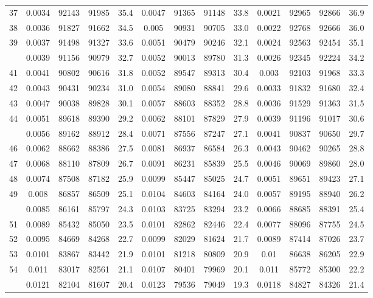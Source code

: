 \documentclass[
  14pt,
]{article}
\begin{document}
\begin{longtable}[t]{lcccccccccccc}
37 & 0.0034 & 92143 & 91985 & 35.4 & 0.0047 & 91365 & 91148 & 33.8 & 0.0021 & 92965 & 92866 & 36.9\\
38 & 0.0036 & 91827 & 91662 & 34.5 & 0.005 & 90931 & 90705 & 33.0 & 0.0022 & 92768 & 92666 & 36.0\\
39 & 0.0037 & 91498 & 91327 & 33.6 & 0.0051 & 90479 & 90246 & 32.1 & 0.0024 & 92563 & 92454 & 35.1\\
\addlinespace
40 & 0.0039 & 91156 & 90979 & 32.7 & 0.0052 & 90013 & 89780 & 31.3 & 0.0026 & 92345 & 92224 & 34.2\\
41 & 0.0041 & 90802 & 90616 & 31.8 & 0.0052 & 89547 & 89313 & 30.4 & 0.003 & 92103 & 91968 & 33.3\\
42 & 0.0043 & 90431 & 90234 & 31.0 & 0.0054 & 89080 & 88841 & 29.6 & 0.0033 & 91832 & 91680 & 32.4\\
43 & 0.0047 & 90038 & 89828 & 30.1 & 0.0057 & 88603 & 88352 & 28.8 & 0.0036 & 91529 & 91363 & 31.5\\
44 & 0.0051 & 89618 & 89390 & 29.2 & 0.0062 & 88101 & 87829 & 27.9 & 0.0039 & 91196 & 91017 & 30.6\\
\addlinespace
45 & 0.0056 & 89162 & 88912 & 28.4 & 0.0071 & 87556 & 87247 & 27.1 & 0.0041 & 90837 & 90650 & 29.7\\
46 & 0.0062 & 88662 & 88386 & 27.5 & 0.0081 & 86937 & 86584 & 26.3 & 0.0043 & 90462 & 90265 & 28.8\\
47 & 0.0068 & 88110 & 87809 & 26.7 & 0.0091 & 86231 & 85839 & 25.5 & 0.0046 & 90069 & 89860 & 28.0\\
48 & 0.0074 & 87508 & 87182 & 25.9 & 0.0099 & 85447 & 85025 & 24.7 & 0.0051 & 89651 & 89423 & 27.1\\
49 & 0.008 & 86857 & 86509 & 25.1 & 0.0104 & 84603 & 84164 & 24.0 & 0.0057 & 89195 & 88940 & 26.2\\
\addlinespace
50 & 0.0085 & 86161 & 85797 & 24.3 & 0.0103 & 83725 & 83294 & 23.2 & 0.0066 & 88685 & 88391 & 25.4\\
51 & 0.0089 & 85432 & 85050 & 23.5 & 0.0101 & 82862 & 82446 & 22.4 & 0.0077 & 88096 & 87755 & 24.5\\
52 & 0.0095 & 84669 & 84268 & 22.7 & 0.0099 & 82029 & 81624 & 21.7 & 0.0089 & 87414 & 87026 & 23.7\\
53 & 0.0101 & 83867 & 83442 & 21.9 & 0.0101 & 81218 & 80809 & 20.9 & 0.01 & 86638 & 86205 & 22.9\\
54 & 0.011 & 83017 & 82561 & 21.1 & 0.0107 & 80401 & 79969 & 20.1 & 0.011 & 85772 & 85300 & 22.2\\
\addlinespace
55 & 0.0121 & 82104 & 81607 & 20.4 & 0.0123 & 79536 & 79049 & 19.3 & 0.0118 & 84827 & 84326 & 21.4\\

\end{longtable}
\end{document}
